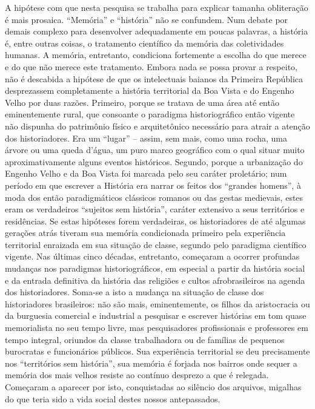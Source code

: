 A hipótese com que nesta pesquisa se trabalha para explicar tamanha obliteração é mais prosaica. ``Memória'' e ``história'' não se confundem. Num debate por demais complexo para desenvolver adequadamente em poucas palavras, a história é, entre outras coisas, o tratamento científico da memória das coletividades humanas. A memória, entretanto, condiciona fortemente a escolha do que merece e do que não merece este tratamento. Embora nada se possa provar a respeito, não é descabida a hipótese de que os intelectuais baianos da Primeira República desprezassem completamente a história territorial da Boa Vista e do Engenho Velho por duas razões. Primeiro, porque se tratava de uma área até então eminentemente rural, que consoante o paradigma historiográfico então vigente não dispunha do patrimônio físico e arquitetônico necessário para atrair a atenção dos historiadores. Era um ``lugar'' -- assim, sem mais, como uma rocha, uma árvore ou uma queda d'água, um puro marco geográfico com o qual situar muito aproximativamente alguns eventos históricos. Segundo, porque a urbanização do Engenho Velho e da Boa Vista foi marcada pelo seu caráter proletário; num período em que escrever a História era narrar os feitos dos ``grandes homens'', à moda dos então paradigmáticos clássicos romanos ou das gestas medievais, estes eram os verdadeiros ``sujeitos sem história'', caráter extensivo a seus territórios e residências. Se estas hipóteses forem verdadeiras, os historiadores de até algumas gerações atrás tiveram sua memória condicionada primeiro pela experiência territorial enraizada em sua situação de classe, segundo pelo paradigma científico vigente. Nas últimas cinco décadas, entretanto, começaram a ocorrer profundas mudanças nos paradigmas historiográficos, em especial a partir da história social e da entrada definitiva da história das religiões e cultos afrobrasileiros na agenda dos historiadores. Soma-se a isto a mudança na situação de classe dos historiadores brasileiros: não são mais, eminentemente, os filhos da aristocracia ou da burguesia comercial e industrial a pesquisar e escrever histórias em tom quase memorialista no seu tempo livre, mas pesquisadores profissionais e professores em tempo integral, oriundos da classe trabalhadora ou de famílias de pequenos burocratas e funcionários públicos. Sua experiência territorial se deu precisamente nos ``territórios sem história'', sua memória é forjada nos bairros onde sequer a memória dos mais velhos resiste ao contínuo desprezo a que é relegada. Começaram a aparecer por isto, conquistadas ao silêncio dos arquivos, migalhas do que teria sido a vida social destes nossos antepassados.

